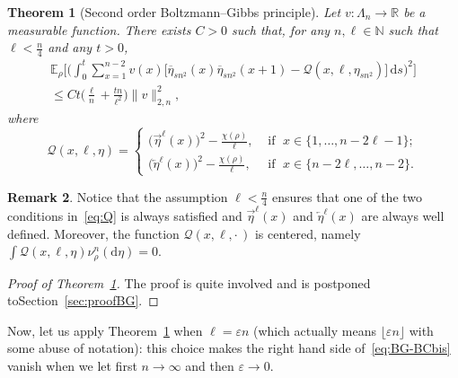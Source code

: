 \documentclass[10pt]{amsart}
\newtheorem{theo}{Theorem}[section]
\theoremstyle{definition}\newtheorem{defi}[theo]{Definition}\newtheorem{rema}[theo]{Remark}\newtheorem{exam}[theo]{Example}\newtheorem{exem}[theo]{Example}\newtheorem{nota}[theo]{Notation}
\newcommand{\bb}[1]{{\mathbb #1}}
\newcommand{\mc}[1]{{\mathcal #1}}
\renewcommand{\mc}[1]{{\mathcal #1}}
\renewcommand\vec[1]{\overrightarrow{#1}}
\newcommand\vecleft[1]{\overleftarrow{#1}}
\renewcommand{\bar}{\overline}
\renewcommand{\leq}{\leqslant}
\newcommand*{\dd}{\mathrm{d}}
\newcommand*{\ds}{\dd s}
\begin{document}
\begin{theo}[Second order Boltzmann--Gibbs principle]\label{theo:BG}
Let $v:\Lambda_n\to\bb R$ be a measurable function. There exists $C>0$ such that, for any $n,\ell\in\bb N$ such that $\ell < \frac n 4$ and any $t>0$,
\begin{multline}\label{eq:BG-BCbis}
\bb E_\rho\bigg[\bigg(\int_0^t \sum_{x=1}^{n-2} v(x) \Big[\bar\eta_{sn^2}(x)\bar\eta_{sn^2}(x+1) - \mc Q(x,\ell,\eta_{sn^2})\Big] \,\ds\bigg)^2\bigg]\\ \leq Ct \Big(\frac{\ell}{n} + \frac{tn}{\ell^2}\Big) \|v\|^2_{2,n},
\end{multline}
where
\begin{equation}\label{eq:Q}
\mc Q(x,\ell,\eta)=
\begin{cases}
\displaystyle \big(\vec\eta^\ell(x)\big)^2 - \frac{\chi(\rho)}{\ell}, &\text{ if }\; x \in\{1, \dots, n-2\ell-1\}; \\[0.65em]
\displaystyle \big(\vecleft\eta^\ell(x)\big)^2 - \frac{\chi(\rho)}{\ell}, & \text{ if }\; x\in\{ n-2\ell, \dots, n-2\}.
\end{cases}
\end{equation}
\end{theo}

\begin{rema}
Notice that the assumption $\ell < \frac n 4$ ensures that one of the two conditions in~\eqref{eq:Q} is always satisfied and $\vec\eta^\ell(x)$ and $\vecleft\eta^\ell(x)$ are always well defined. Moreover, the function $\mc Q(x,\ell,\cdot\,)$ is centered, namely $\int \mc Q(x,\ell,\eta)\nu_\rho^n(\dd\eta)= 0$.
\end{rema}

\begin{proof}[Proof of Theorem~\ref{theo:BG}]
The proof is quite involved and is postponed to\linebreak Section~\ref{sec:proofBG}.
\end{proof}

Now, let us apply Theorem~\ref{theo:BG} when $\ell=\varepsilon n$ (which actually means $\lfloor \varepsilon n \rfloor$ with some abuse of notation): this choice makes the right hand side of~\eqref{eq:BG-BCbis} vanish when we let first $n\to \infty$ and then $\varepsilon \to 0$.
\end{document}
